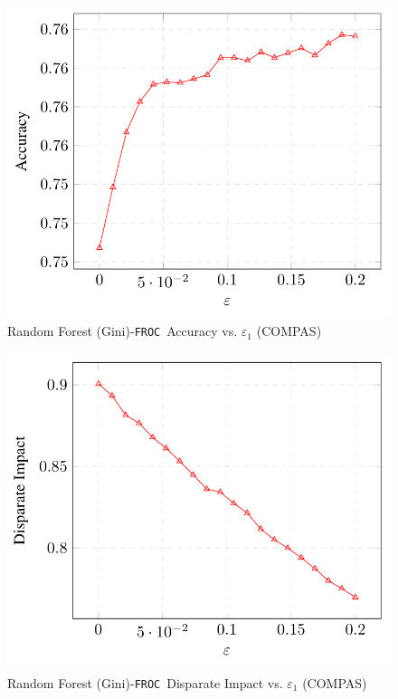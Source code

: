 \documentclass{article}
\newcommand{\ouralgo}{\texttt{FROC}}
\begin{document}
\begin{figure}[!h]
    \centering
    \includegraphics[width=1\linewidth]{Images/RFG_COMPAS_Accuracy.png}
    \caption{Random Forest (Gini)-\ouralgo\  Accuracy vs. $\varepsilon_1$ (COMPAS)}
    \label{fig:RFG_COMPAS_Accuracy}
\end{figure}

\begin{figure}[!h]
    \centering
    \includegraphics[width=1\linewidth]{Images/RFG_COMPAS_DI.png}
    \caption{Random Forest (Gini)-\ouralgo\  Disparate Impact vs. $\varepsilon_1$ (COMPAS)}
    \label{fig:RFG_COMPAS_DI}
\end{figure}
\end{document}
